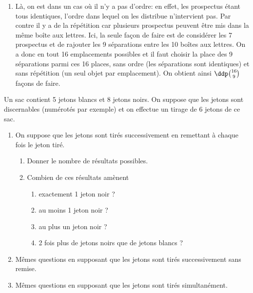 \documentclass[a4paper, 11pt]{article}
\begin{document}
\begin{correction}
\begin{enumerate}
		\item L\`a, on est dans un cas o\`u il n'y a pas d'ordre: en effet, les prospectus \'etant tous identiques, l'ordre dans lequel on les distribue n'intervient pas. Par contre il y a de la r\'ep\'etition car plusieurs prospectus peuvent \^etre mis dans la m\^eme bo\^ite aux lettres. Ici, la seule fa\c{c}on de faire est de consid\'erer les 7 prospectus et de rajouter les 9 s\'eparations entre les 10 bo\^ites aux lettres. On a donc en tout 16 emplacements possibles et il faut choisir la place des 9 s\'eparations parmi ces 16 places, sans ordre (les s\'eparations sont identiques) et sans r\'ep\'etition (un seul objet par emplacement). On obtient ainsi $\ddp \binom{16}{9}$ fa\c{c}ons de faire.
	\end{enumerate}
\end{correction}
\begin{exercice}  \;
	Un sac contient 5 jetons blancs et 8 jetons noirs. On suppose que les jetons sont discernables (num\'erot\'es par exemple) et on effectue un tirage de 6 jetons de ce sac.
	\begin{enumerate}
		\item On suppose que les jetons sont tir\'es successivement en remettant \`a chaque fois le jeton tir\'e.
		      \begin{enumerate}
			      \item Donner le nombre de r\'esultats possibles.
			      \item Combien de ces r\'esultats am\`enent
			            \begin{enumerate}
				            \item exactement 1 jeton noir ?
				            \item au moins 1 jeton noir ?
				            \item au plus un jeton noir ?
				            \item 2 fois plus de jetons noirs que de jetons blancs ?
			            \end{enumerate}
		      \end{enumerate}
		\item M\^emes questions en supposant que les jetons sont tir\'es successivement sans remise.
		\item M\^emes questions en supposant que les jetons sont tir\'es simultan\'ement.
	\end{enumerate}
\end{exercice}
\end{document}
